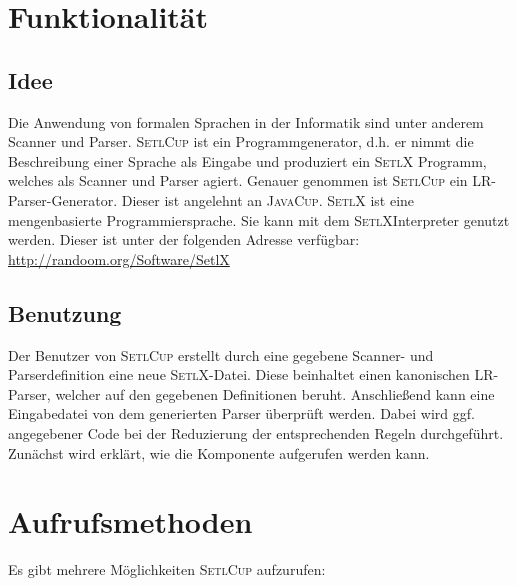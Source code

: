 \section{Funktionalität}
\subsection{Idee}
Die Anwendung von formalen Sprachen in der Informatik sind unter anderem Scanner und Parser\cite{Aho86}\cite{stroetmann:formallanguages}. \textsc{SetlCup} ist ein Programmgenerator, d.h. er nimmt die Beschreibung einer Sprache als Eingabe und produziert ein \textsc{SetlX} Programm, welches als Scanner und Parser agiert. Genauer genommen ist \textsc{SetlCup} ein LR-Parser-Generator. Dieser ist angelehnt an \textsc{JavaCup}\cite{javacup:2016}.
\textsc{SetlX} ist eine mengenbasierte Programmiersprache. Sie kann mit dem \textsc{SetlX}Interpreter genutzt werden. Dieser ist unter der folgenden Adresse verfügbar:
\href{http://randoom.org/Software/SetlX}{{http://randoom.org/Software/SetlX}}
\subsection{Benutzung}
Der Benutzer von \textsc{SetlCup} erstellt durch eine gegebene Scanner- und Parserdefinition eine neue \textsc{SetlX}-Datei. Diese beinhaltet einen kanonischen LR-Parser, welcher auf den gegebenen Definitionen beruht. Anschließend kann eine Eingabedatei von dem generierten Parser überprüft werden. Dabei wird ggf. angegebener Code bei der Reduzierung der entsprechenden Regeln durchgeführt. 
Zunächst wird erklärt, wie die Komponente aufgerufen werden kann.
\section{Aufrufsmethoden}
Es gibt mehrere Möglichkeiten \textsc{SetlCup} aufzurufen:
